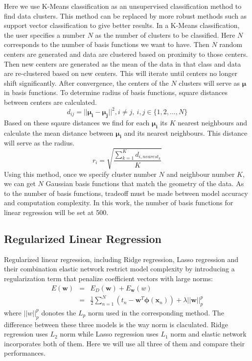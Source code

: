 \documentclass[11pt]{article}
\begin{document}
Here we use K-Means classification as an unsupervised classification method to find data clusters. This method can be replaced by more robust methods such as support vector classification to give better results. In a K-Means classification, the user specifies a number $N$ as the number of clusters to be classified. Here $N$ corresponds to the number of basis functions we want to have. Then $N$ random centers are generated and data are clustered based on proximity to those centers. Then new centers are generated as the mean of the data in that class and data are re-clustered based on new centers. This will iterate until centers no longer shift significantly. After convergence, the centers of the $N$ clusters will serve as $\boldsymbol{\mu}$ in basis functions. To determine radius of basis functions, square distances between centers are calculated.
$$d_{ij} = ||\boldsymbol{\mu_i} - \boldsymbol{\mu_j}||^2, i \neq j, \ i,j \in \{1, 2, ..., N \}$$
Based on these sqaure distances we find for each $\boldsymbol{\mu_i}$ its $K$ nearest neighbours and calculate the mean distance between $\boldsymbol{\mu_i}$ and its nearest neighbours. This distance will serve as the radius.
$$r_i = \sqrt{\frac{\sum_{k = 1}^K d_{i,nearest_k}}{K}}$$
Using this method, once we specify cluster number $N$ and neighbour number $K$, we can get $N$ Gaussian basis functions that match the geometry of the data. As to the number of basis functions, tradeoff must be made between model accuracy and computation complexity. In this work, the number of basis functions for linear regression will be set at 500.

\subsection{Regularized Linear Regression}\label{linear regression}
Regularized linear regression, including Ridge regression, Lasso regression and their combination elastic network restrict model complexity by introducing a regularization term that penalize coefficient vectors with large norms: 
\begin{eqnarray}
E(\textbf{w}) &=& E_D(\textbf{w}) + E_\textbf{w}(w) \\
              &=& \frac{1}{2}\sum_{n=1}^N(t_n - \textbf{w}^T\boldsymbol{\phi} (\textbf{x}_n)) + \lambda||\textbf{w}||_p^p
\end{eqnarray}
where $||w||_p^p$ donotes the $L_p$ norm used in the corresponding method. The difference between these three models is the way norm is claculated. Ridge regression uses $L_2$ norm while Lasso regression uses $L_1$ norm and elastic network incorporates both of them. Here we will use all three of them and compare their performances.
\end{document}
